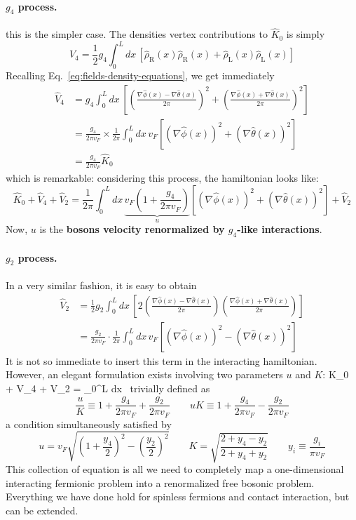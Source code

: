 \paragraph{$g_4$ process.} this is the simpler case. The densities vertex contributions to $\hat K_0$ is simply
\[
	\hat V_4 = \frac{1}{2} g_4 \int_0^L dx \, \left[ \hat \rho_\mathrm{R} (x) \hat \rho_\mathrm{R} (x) + \hat \rho_\mathrm{L} (x) \hat \rho_\mathrm{L} (x) \right]
\]
Recalling Eq.~\eqref{eq:fields-density-equations}, we get immediately
\[
\begin{aligned}
	\hat V_4 &= g_4 \int_0^L dx \, \left[ \left( \frac{\nabla \hat \phi(x) - \nabla \hat \theta(x)}{2\pi} \right)^2 + \left( \frac{\nabla \hat \phi(x) + \nabla \hat \theta(x)}{2\pi} \right)^2 \right] \\
	&= \frac{g_4}{2\pi v_F} \times \frac{1}{2\pi} \int_0^L dx \, v_F \left[ \left( \nabla \hat \phi(x) \right)^2 + \left( \nabla \hat \theta(x) \right)^2 \right] \\
	&= \frac{g_4}{2\pi v_F} \hat K_0
\end{aligned}
\]
which is remarkable: considering this process, the hamiltonian looks like:
\[
	\hat K_0 + \hat V_4 + \hat V_2 = \frac{1}{2\pi} \int_0^L dx \, \underbrace{v_F \left( 1 + \frac{g_4}{2\pi v_F} \right)}_{u} \left[ \left( \nabla \hat \phi(x) \right)^2 + \left( \nabla \hat \theta(x) \right)^2 \right] + \hat V_2
\]
Now, $u$ is the \textbf{bosons velocity renormalized by $g_4$-like interactions}.

\paragraph{$g_2$ process.} In a very similar fashion, it is easy to obtain
\[
\begin{aligned}
	\hat V_2 &= \frac{1}{2} g_2 \int_0^L dx \, \left[ 2 \left( \frac{\nabla \hat \phi(x) - \nabla \hat \theta(x)}{2\pi} \right) \left( \frac{\nabla \hat \phi(x) + \nabla \hat \theta(x)}{2\pi} \right) \right] \\
	&= \frac{g_2}{2\pi v_F} \cdot \frac{1}{2\pi} \int_0^L dx \, v_F \left[ \left( \nabla \hat \phi(x) \right)^2 - \left( \nabla \hat \theta(x) \right)^2 \right]
\end{aligned}
\]
It is not so immediate to insert this term in the interacting hamiltonian. However, an elegant formulation exists involving two parameters $u$ and $K$:
\beq\label{eq:interacting-fields-hamiltonian}
	\hat K_0 + \hat V_4 + \hat V_2 =  \int_0^L dx \, 
\eeq
trivially defined as
\[
	\frac{u}{K} \equiv 1 + \frac{g_4}{2\pi v_F} + \frac{g_2}{2\pi v_F}
	\qquad
	uK \equiv 1 + \frac{g_4}{2\pi v_F} - \frac{g_2}{2\pi v_F}
\]
a condition simultaneously satisfied by
\[
	u = v_F \sqrt{\left(1 + \frac{y_4}{2}\right)^2 - \left(\frac{y_2}{2}\right)^2}
	\qquad
	K = \sqrt{\frac{2 + y_4 - y_2}{2 + y_4 + y_2}}
	\qquad
	y_i \equiv \frac{g_i}{\pi v_F}
\]
This collection of equation is all we need to completely map a one-dimensional interacting fermionic problem into a renormalized free bosonic problem. Everything we have done hold for spinless fermions and contact interaction, but can be extended.

